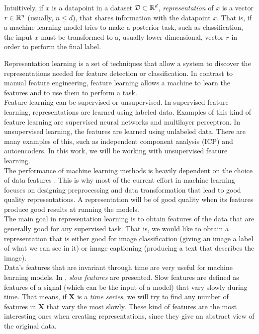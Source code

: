 Intuitively, if $x$ is a datapoint in a dataset $\mathcal{D} \subset \mathbb{R}^d$,  \emph{representation} of $x$ is a vector $r \in \mathbb{R}^n$ (usually, $n \leq d$), that shares information with the datapoint $x$. That is, if a machine learning model
tries to make a posterior task, such as classification, the input $x$ must be transformed to a, usually lower dimensional, vector $r$ in order to perform the final label.


Representation learning is a set of techniques that allow a system to discover the representations needed for feature detection or classification. 
In contrast to manual feature engineering, feature learning allows a machine to learn the features and to use them to perform a task.\\

Feature learning can be supervised or unsupervised. In supervised feature learning, representations are learned using labeled data.
Examples of this kind of feature learning are supervised neural networks and multilayer perceptron. In unsupervised learning, the features are learned using unlabeled data. 
There are many examples of this, such as independent component analysis (ICP) and autoencoders. In this work, we will be working with unsupervised feature learning.\\

The performance of machine learning methods is heavily dependent on the choice of data features \citep{bengio_representation_2014}. This is why most of the current 
effort in machine learning focuses on designing preprocessing and data transformation that lead to good quality representations. A representation will be of good quality when its features
produce good results at running the models.\\

The main goal in representation learning is to obtain features of the data that are generally good for any supervised task. That is, we would like to obtain
a representation that is either good for image classification (giving an image a label of what we can see in it) or image captioning (producing a text that describes the image).\\

Data's features that are invariant through time are very useful for machine learning models. In \citep{wiskott_slow_2002}, \emph{slow features} are presented. Slow features are defined as features of a signal 
(which can be the input of a model) that vary slowly during time. That means, if $\bm{X}$ is a \emph{time series}\footnotemark, we will try to find any number of features in $\bm{X}$ that vary the most slowly. These kind of features are the most interesting ones when creating representations, since they give an abstract view of the original data.\\


